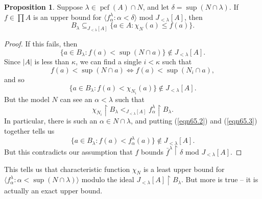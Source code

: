 \documentclass[10pt]{amsart}
\theoremstyle{plain}
\theoremstyle{definition}
\newtheorem{proposition}{Proposition}
\theoremstyle{remark}
\DeclareMathOperator{\pcf}{pcf}
\numberwithin{equation}{section}
\begin{document}
\begin{proposition}
\label{prop:CharGenProp} Suppose $\lambda\in\pcf(A)\cap N$, and let $\delta=\sup(N\cap\lambda)$. If $f\in\prod A$ is an upper bound for
$\langle f^\lambda_\alpha:\alpha<\delta\rangle$ mod $J_{<\lambda}[A]$, then
\begin{equation}
B_\lambda\subseteq_{J_{<\lambda}[A]}\{a\in A: \chi_N(a)\leq f(a)\}.
\end{equation}
\end{proposition}
\begin{proof}
If this fails, then
\begin{equation}
\{a\in B_\lambda: f(a)<\sup(N\cap a)\}\notin J_{<\lambda}[A].
\end{equation}
Since $|A|$ is less than $\kappa$, we can find a single $i<\kappa$ such that
\begin{equation}
f(a)<\sup(N\cap a)\Longleftrightarrow f(a)<\sup(N_i\cap a),
\end{equation}
and so
\begin{equation}
\label{eqn65.2}
\{a\in B_\lambda: f(a)<\chi_{N_i}(a)\}\notin J_{<\lambda}[A].
\end{equation}
But the model $N$ can see an $\alpha<\lambda$ such that
\begin{equation}
\label{eqn65.3}
\chi_{N_i}\restriction B_\lambda <_{J_{<\lambda}[A]} f^\lambda_\alpha\restriction B_\lambda.
\end{equation}
In particular, there is such an $\alpha\in N\cap\lambda$, and putting (\ref{eqn65.2}) and (\ref{eqn65.3}) together tells us
\begin{equation}
\{a\in B_\lambda: f(a)< f^\lambda_\alpha(a)\}\notin J_{<\lambda}[A].
\end{equation}
But this contradicts our assumption that $f$ bounds $\bar{f}^\lambda\restriction\delta$ mod $J_{<\lambda}[A]$.
\end{proof}

This tells us that characteristic function $\chi_N$ is a least upper bound for $\langle f^\lambda_\alpha:\alpha<\sup(N\cap\lambda)\rangle$
modulo the ideal $J_{<\lambda}[A]\restriction B_\lambda$. But more is true -- it is actually an exact upper bound.
\end{document}
